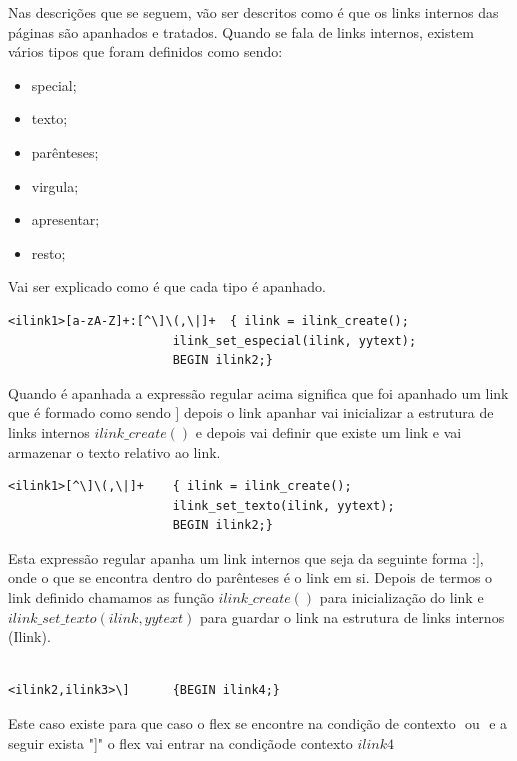 \documentclass[11pt, a4paper, oneside]{article}
\begin{document}
Nas descrições que se seguem, vão ser descritos como é que os links internos das páginas são apanhados e tratados.
Quando se fala de links internos, existem vários tipos que foram definidos como sendo:
\begin{itemize}
\item special;
\item texto;
\item parênteses;
\item virgula;
\item apresentar;
\item resto;
\end{itemize}


Vai ser explicado como é que cada tipo é apanhado.

\begin{verbatim}
<ilink1>[a-zA-Z]+:[^\]\(,\|]+  { ilink = ilink_create();
                       ilink_set_especial(ilink, yytext); 
                       BEGIN ilink2;}
\end{verbatim}


Quando é apanhada a expressão regular acima significa que foi apanhado um link que é formado como sendo \begin{math}[[Category:Salts]]\end{math} depois o link apanhar vai inicializar a estrutura de links internos \begin{math} ilink\_create() \end{math} e depois vai definir que existe um link e vai armazenar o texto relativo ao link.

\begin{verbatim}
<ilink1>[^\]\(,\|]+    { ilink = ilink_create();
                       ilink_set_texto(ilink, yytext);
                       BEGIN ilink2;}
\end{verbatim}
Esta expressão regular apanha um link internos que seja da seguinte forma :\begin{math}[[Salts]]\end{math}, onde o que se encontra dentro do parênteses é o link em si. Depois de termos o link definido chamamos as função \begin{math} ilink\_create() \end{math} para inicialização do link e  \begin{math}ilink\_set\_texto(ilink, yytext)\end{math} para guardar o link na estrutura de links internos (Ilink).


\begin{verbatim}

<ilink2,ilink3>\]      {BEGIN ilink4;}
\end{verbatim}
Este caso existe para que caso o flex se encontre na condição de contexto \begin{math}<ilink2>\end{math} ou \begin{math}<ilink3>\end{math} e a seguir exista "]" o flex vai entrar na condiçãode contexto \begin{math}ilink4\end{math}
\end{document}
